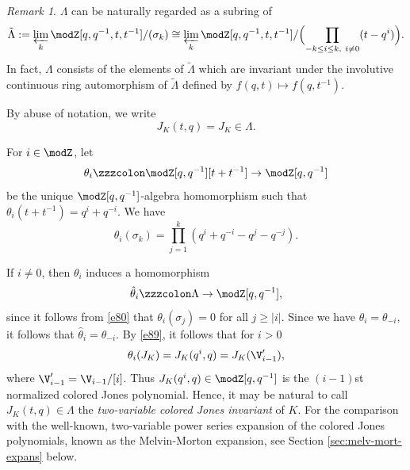 \documentclass{amsart}
\numberwithin{equation}{section}
\numberwithin{figure}{section}
\theoremstyle{plain}
\theoremstyle{definition}
\theoremstyle{remark}
\newtheorem{remark}[theorem]{Remark}
\begin{document}
\begin{remark}
  \label{r27}
  $\Lambda $ can be naturally regarded as a subring of
  \begin{equation*}
    \tilde\Lambda :=\varprojlim_{k}\modZ [q,q^{-1},t,t^{-1}]/(\sigma _k)
    \cong\varprojlim_k\modZ [q,q^{-1},t,t^{-1}]/
      \Bigl(\prod_{-k\le i\le k,\ i\neq0}(t-q^i)\Bigr).
  \end{equation*}
  In fact, $\Lambda $ consists of the elements of $\tilde\Lambda $ which are
  invariant under the involutive continuous ring automorphism of
  $\tilde\Lambda $ defined by $f(q,t)\mapsto f(q,t^{-1})$.
\end{remark}

By abuse of notation, we write
\begin{equation*}
  J_K(t,q)=J_K\in \Lambda .
\end{equation*}

For $i\in \modZ $, let
\begin{equation*}
  \theta _i\zzzcolon \modZ [q,q^{-1}][t+t^{-1}] \rightarrow  \modZ [q,q^{-1}]
\end{equation*}
be the unique $\modZ [q,q^{-1}]$-algebra homomorphism such that
$\theta _i(t+t^{-1})=q^i+q^{-i}$.  We have
\begin{equation}
  \label{e80}
  \theta _i(\sigma _k)=\prod_{j=1}^k(q^i+q^{-i}-q^j-q^{-j}).
\end{equation}

If $i\neq0$, then $\theta _i$ induces a homomorphism
\begin{equation*}
  \hat\theta _i\zzzcolon \Lambda  \rightarrow  \modZ [q,q^{-1}],
\end{equation*}
since it follows from \eqref{e80} that $\theta _i(\sigma _j)=0$ for all
$j\ge |i|$.  Since we have $\theta _i=\theta _{-i}$, it follows that
$\hat\theta _i=\hat\theta _{-i}$.  By \eqref{e89}, it follows that for $i>0$
\begin{equation}
  \label{e51}
  \theta _i(J_K)=J_K(q^i,q) = J_K(\V'_{i-1}),
\end{equation}
where $\V'_{i-1}=\V_{i-1}/[i]$.  Thus $J_K(q^i,q)\in \modZ [q,q^{-1}]$
is the $(i-1)$st normalized colored Jones polynomial.  Hence, it may
be natural to call $J_K(t,q)\in \Lambda $ the {\em two-variable colored Jones
invariant} of $K$.  For the comparison with the well-known,
two-variable power series expansion of the colored Jones polynomials,
known as the Melvin-Morton expansion, see Section
\ref{sec:melv-mort-expans} below.
\end{document}
